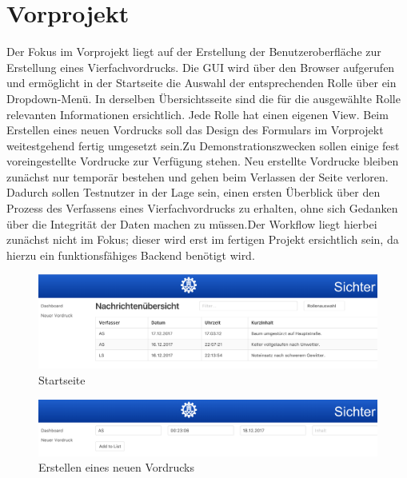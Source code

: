 \section{Vorprojekt}
Der Fokus im Vorprojekt liegt auf der Erstellung der Benutzeroberfläche zur Erstellung eines Vierfachvordrucks. 
Die GUI wird über den Browser aufgerufen und ermöglicht in der Startseite die Auswahl der entsprechenden Rolle über 
ein Dropdown-Menü. In derselben Übersichtsseite sind die für die ausgewählte Rolle relevanten Informationen ersichtlich. 
Jede Rolle hat einen eigenen View. Beim Erstellen eines neuen Vordrucks soll das Design des Formulars im Vorprojekt 
weitestgehend fertig umgesetzt sein.Zu Demonstrationszwecken sollen einige fest voreingestellte Vordrucke zur Verfügung stehen. Neu erstellte Vordrucke bleiben zunächst nur temporär bestehen und gehen beim Verlassen der Seite verloren. Dadurch sollen Testnutzer in der Lage sein, einen ersten Überblick über den Prozess des Verfassens eines Vierfachvordrucks zu erhalten,
ohne sich Gedanken über die Integrität der Daten machen zu müssen.Der Workflow liegt hierbei zunächst nicht im Fokus; dieser wird erst im fertigen Projekt ersichtlich sein, da hierzu
ein funktionsfähiges Backend benötigt wird.

    \begin{figure}[htpb]
        \centering
        \includegraphics[width=0.95\linewidth]{vorprojekt_01.png}
        \caption{Startseite}
    \end{figure}


    \begin{figure}[htpb]
        \centering
        \includegraphics[width=0.95\linewidth]{vorprojekt_02.png}
        \caption{Erstellen eines neuen Vordrucks}
    \end{figure}
